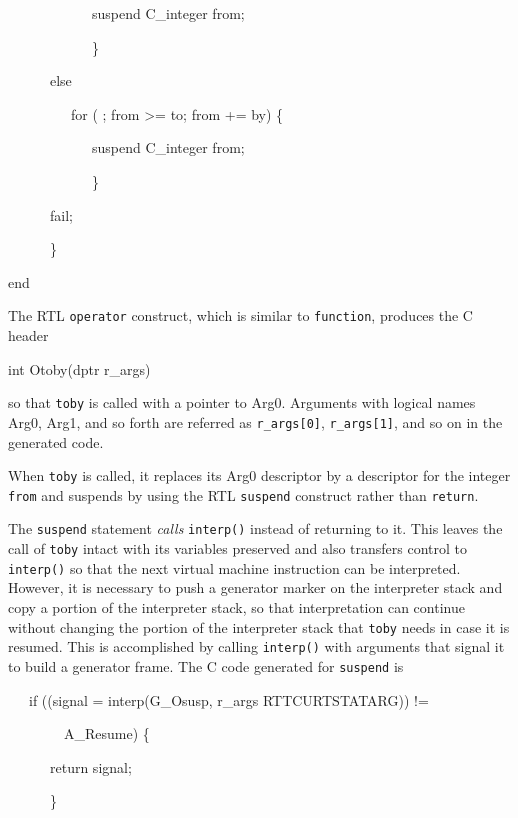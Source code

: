 {\ttfamily\mdseries
\ \ \ \ \ \ \ \ \ \ \ \ suspend C\_integer from;}

{\ttfamily\mdseries
\ \ \ \ \ \ \ \ \ \ \ \ \}}

{\ttfamily\mdseries
\ \ \ \ \ \ else}

{\ttfamily\mdseries
\ \ \ \ \ \ \ \ \ for ( ; from {\textgreater}= to; from += by) \{}

{\ttfamily\mdseries
\ \ \ \ \ \ \ \ \ \ \ \ suspend C\_integer from;}

{\ttfamily\mdseries
\ \ \ \ \ \ \ \ \ \ \ \ \}}

{\ttfamily\mdseries
\ \ \ \ \ \ fail;}

{\ttfamily\mdseries
\ \ \ \ \ \ \}}

{\ttfamily\mdseries
end}

The RTL \texttt{operator} construct, which is similar to
\texttt{function}, produces the C header

{\ttfamily\mdseries
int Otoby(dptr r\_args)}

\noindent so that \texttt{toby} is called with a pointer to
Arg0. Arguments with logical names Arg0, Arg1, and so forth are
referred as \texttt{r\_args[0]}, \texttt{r\_args[1]}, and so on in the
generated code.

When \texttt{toby} is called, it replaces its Arg0 descriptor by a
descriptor for the integer \texttt{from} and suspends by using the RTL
\texttt{suspend} construct rather than \texttt{return}.

The \texttt{suspend} statement \textit{calls }\texttt{interp()}
instead of returning to it. This leaves the call of \texttt{toby}
intact with its variables preserved and also transfers control to
\texttt{interp()} so that the next virtual machine instruction can be
interpreted. However, it is necessary to push a generator marker on
the interpreter stack and copy a portion of the interpreter stack, so
that interpretation can continue without changing the portion of the
interpreter stack that \texttt{toby} needs in case it is resumed. This
is accomplished by calling \texttt{interp()} with arguments that
signal it to build a generator frame. The C code generated for
\texttt{suspend} is

{\ttfamily\mdseries
\ \ \ if ((signal = interp(G\_Osusp, r\_args RTTCURTSTATARG)) !=}

{\ttfamily\mdseries
\ \ \ \ \ \ \ \ A\_Resume) \{}

{\ttfamily\mdseries
\ \ \ \ \ \ return signal;}

{\ttfamily\mdseries
\ \ \ \ \ \ \}}

